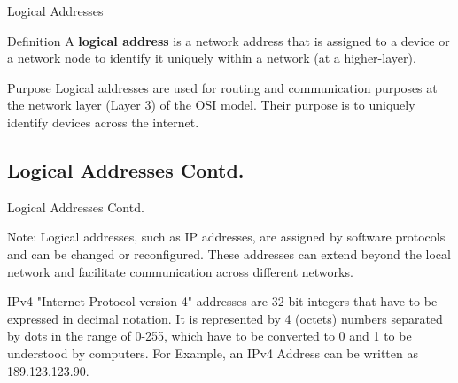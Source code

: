 \documentclass[10pt, aspectratio=43]{beamer}
\begin{document}
\begin{frame}{Logical Addresses}
    \begin{block}{Definition}
        A \textbf{logical address} is a network address that is assigned to a device or a network node to identify it uniquely within a network (at a higher-layer).
    \end{block}

    \begin{block}{Purpose} 
        Logical addresses are used for routing and communication purposes at the network layer (Layer 3) of the OSI model. Their purpose is to uniquely identify devices across the internet. 
    \end{block}
\end{frame}

\subsection{Logical Addresses Contd.}
\begin{frame}{Logical Addresses Contd.}
    \begin{block}{Note:}
         Logical addresses, such as IP addresses, are assigned by software protocols and can be changed or reconfigured. These addresses can extend beyond the local network and facilitate communication across different networks.
    \end{block}

\begin{alertblock}{IPv4}
    "Internet Protocol version 4" addresses are 32-bit integers that have to be expressed in decimal notation. It is represented by 4 (octets) numbers separated by dots in the range of 0-255, which have to be converted to 0 and 1 to be understood by computers. For Example, an IPv4 Address can be written as 189.123.123.90.
\end{alertblock}    
\end{frame}
\end{document}
